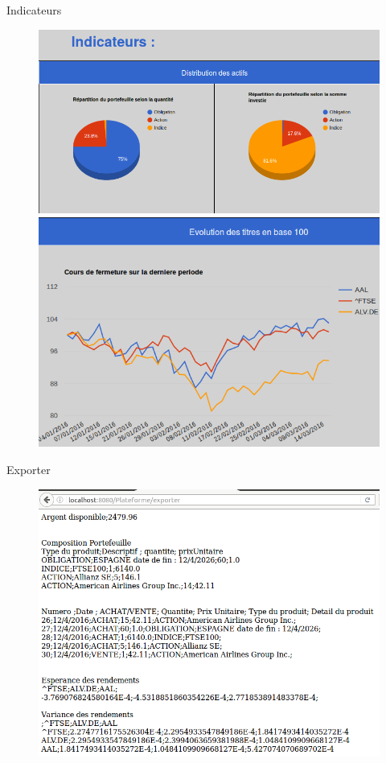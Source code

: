       Indicateurs
      \begin{figure}[H]
	\center
	\includegraphics[scale=0.5]{../graph/7-indicateursPtfcamemberts.png}
	\includegraphics[scale=0.5]{../graph/7-indicateursbase100.png}
      \end{figure}

      Exporter  
      \begin{figure}[H]
	\center	
	\includegraphics[scale=0.5]{../graph/7-exporterpage.png}
      \end{figure} 
  
